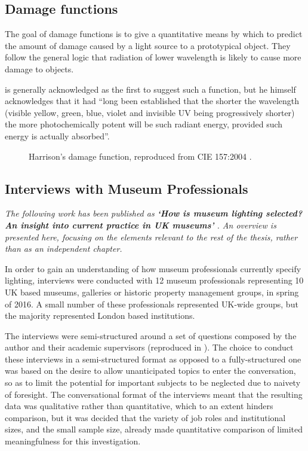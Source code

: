 \subsection{Damage functions} \label{sec:DamageIndex}

The goal of damage functions is to give a quantitative means by which to predict the amount of damage caused by a light source to a prototypical object. They follow the general logic that radiation of lower wavelength is likely to cause more damage to objects.

\citet{harrison_report_1953} is generally acknowledged as the first to suggest such a function, but he himself acknowledges that it had ``long been established that the shorter the wavelength (visible yellow, green, blue, violet and invisible UV being progressively shorter) the more photochemically potent will be such radiant energy, provided such energy is actually absorbed''.

\begin{figure}[htbp]
\caption{Harrison's \citep{harrison_report_1953} damage function, reproduced from CIE 157:2004 \citep{cie_cie_2004}.}
\label{fig:Harrison}
\end{figure}


\subsection{Interviews with Museum Professionals} \label{sec:Interviews}

\textit{The following work has been published as \textbf{`How is museum lighting selected? An insight into current practice in UK museums'} \citep{garside_how_2017}. An overview is presented here, focusing on the elements relevant to the rest of the thesis, rather than as an independent chapter.}

\medskip

In order to gain an understanding of how museum professionals currently specify lighting, interviews were conducted with 12 museum professionals representing 10 UK based museums, galleries or historic property management groups, in spring of 2016. A small number of these professionals represented UK-wide groups, but the majority represented London based institutions.

The interviews were semi-structured around a set of questions composed by the author and their academic supervisors (reproduced in \citet{garside_how_2017}). The choice to conduct these interviews in a semi-structured format as opposed to a fully-structured one was based on the desire to allow unanticipated topics to enter the conversation, so as to limit the potential for important subjects to be neglected due to naivety of foresight. The conversational format of the interviews meant that the resulting data was qualitative rather than quantitative, which to an extent hinders comparison, but it was decided that the variety of job roles and institutional sizes, and the small sample size, already made quantitative comparison of limited meaningfulness for this investigation.

